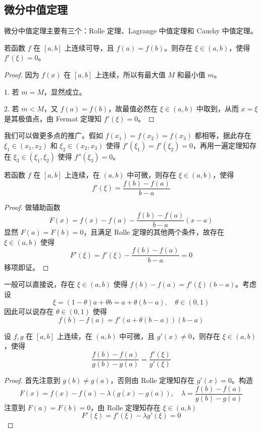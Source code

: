 \subsection{微分中值定理}

微分中值定理主要有三个：Rolle 定理、Lagrange 中值定理和 Cauchy 中值定理。

\begin{theorem}
	若函数 $f$ 在 $[a,b]$ 上连续可导，且 $f(a)=f(b)$。则存在 $\xi\in(a,b)$，使得 $f'(\xi)=0$。
\end{theorem}

\begin{proof}
	因为 $f(x)$ 在 $[a,b]$ 上连续，所以有最大值 $M$ 和最小值 $m$。

	1. 若 $m=M$，显然成立。

	2. 若 $m < M$，又 $f(a) = f(b)$，故最值必然在 $\xi \in (a, b)$ 中取到，从而 $x=\xi$ 是其极值点，由 Fermat 定理知 $f'(\xi) = 0$。
\end{proof}

我们可以做更多点的推广。假如 $f(x_1) = f(x_2) = f(x_3)$ 都相等，据此存在 $\xi_1 \in (x_1, x_2)$ 和 $\xi_2 \in (x_2, x_3)$ 使得 $f'(\xi_1) = f'(\xi_2) = 0$，再用一遍定理知存在 $\xi_3 \in (\xi_1, \xi_2)$ 使得 $f''(\xi_3) = 0$。

\begin{theorem}[Lagrange 定理]
	若函数 $f$ 在 $[a,b]$ 上连续，在 $(a,b)$ 中可微，则存在 $\xi\in(a,b)$，使得
	\[ f'(\xi)=\frac{f(b)-f(a)}{b-a} \]
\end{theorem}

\begin{proof}
	做辅助函数
	\[ F(x) = f(x) - f(a) - \frac{f(b) - f(a)}{b - a}(x - a) \]
	显然 $F(a) = F(b) = 0$，且满足 Rolle 定理的其他两个条件，故存在 $\xi \in (a, b)$ 使得
	\[ F'(\xi) = f'(\xi) - \frac{f(b) - f(a)}{b - a} = 0 \]
	移项即证。
\end{proof}

一般可以直接说，存在 $\xi \in (a, b)$ 使得 $f(b) - f(a) = f'(\xi)(b-a)$。考虑设
\[ \xi = (1-\theta)a + \theta b = a + \theta(b-a), \quad \theta \in (0, 1) \]
因此可以说存在 $\theta \in (0, 1)$ 使得
\[ f(b) - f(a) = f'(a + \theta(b-a)) (b-a) \]

\begin{theorem}
	设 $f,g$ 在 $[a,b]$ 上连续，在 $(a,b)$ 中可微，且 $g'(x)\ne 0$，则存在 $\xi\in (a,b)$，使得
	\[ \frac{f(b)-f(a)}{g(b)-g(a)} = \frac{f'(\xi)}{g'(\xi)} \]
\end{theorem}

\begin{proof}
	首先注意到 $g(b) \neq g(a)$，否则由 Rolle 定理知存在 $g'(x) = 0$。构造
	\[ F(x) = f(x) - f(a) - \lambda (g(x) - g(a)) , \quad \lambda = \frac{f(b) - f(a)}{g(b) - g(a)} \]
	注意到 $F(a) = F(b) = 0$，由 Rolle 定理知存在 $\xi \in (a, b)$
	\[ F'(\xi) = f'(\xi) - \lambda g'(\xi) = 0 \]
\end{proof}



